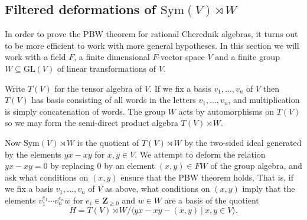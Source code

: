 \documentclass[12pt, reqno]{amsart}
\numberwithin{equation}{section}
\theoremstyle{definition}
\theoremstyle{plain}
\newcommand{\ZZ}{\mathbf{Z}}
\newcommand{\la}{\langle}
\newcommand{\ra}{\rangle}
\begin{document}
\subsection{Filtered deformations of $\mathrm{Sym}(V) \rtimes W$}

In order to prove the PBW theorem for rational Cherednik algebras, it turns out to be more efficient to work with more general hypotheses. In this section we will work with a field $F$, a finite dimensional $F$-vector space $V$ and a finite group $W \subseteq \mathrm{GL}(V)$ of linear transformations of $V$.

Write $T(V)$ for the tensor algebra of $V$. If we fix a basis $v_1,\dots,v_n$ of $V$ then $T(V)$ has basis consisting of all words in the letters $v_1,\dots,v_n$, and multiplication is simply concatenation of words. The group $W$ acts by automorphisms on $T(V)$ so we may form the semi-direct product algebra $T(V) \rtimes W$.

Now $\mathrm{Sym}(V) \rtimes W$ is the quotient of $T(V) \rtimes W$ by the two-sided ideal generated by the elements $yx-xy$ for $x,y \in V$. We attempt to deform the relation $yx-xy=0$ by replacing $0$ by an element $(x, y) \in FW$ of the group algebra, and ask what conditions on $(x,y)$ ensure that the PBW theorem holds. That is, if we fix a basis $v_1,\dots,v_n$ of $V$ as above, what conditions on $(x,y)$ imply that the elements $v_1^{e_1} \cdots v_n^{e_n} w$ for $e_i \in \ZZ_{\geq 0}$ and $w \in W$ are a basis of the quotient
$$H=T(V) \rtimes W / \la yx-xy-(x,y) \ | \ x,y \in V \ra.$$ 
\end{document}
